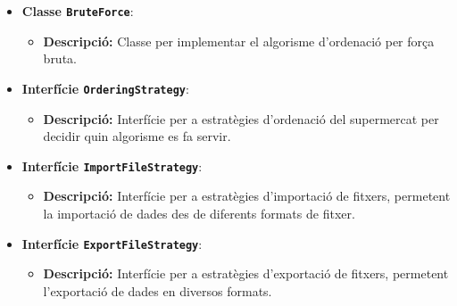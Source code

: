 \documentclass[a4paper,12pt]{report}
\begin{document}
\begin{itemize}
		\item \textbf{Classe \texttt{BruteForce}}:
		\begin{itemize}
			\item \textbf{Descripció:} Classe per implementar el algorisme d'ordenació per força bruta.
		\end{itemize}
		\item \textbf{Interfície \texttt{OrderingStrategy}}:
		\begin{itemize}
			\item \textbf{Descripció:} Interfície per a estratègies d'ordenació del supermercat per decidir quin algorisme es fa servir.
		\end{itemize}
		\item \textbf{Interfície \texttt{ImportFileStrategy}}:
		\begin{itemize}
			\item \textbf{Descripció:} Interfície per a estratègies d'importació de fitxers, permetent la importació de dades des de diferents formats de fitxer.
		\end{itemize}
		\item \textbf{Interfície \texttt{ExportFileStrategy}}:
		\begin{itemize}
			\item \textbf{Descripció:} Interfície per a estratègies d'exportació de fitxers, permetent l'exportació de dades en diversos formats.
		\end{itemize}
	\end{itemize}

\end{document}
